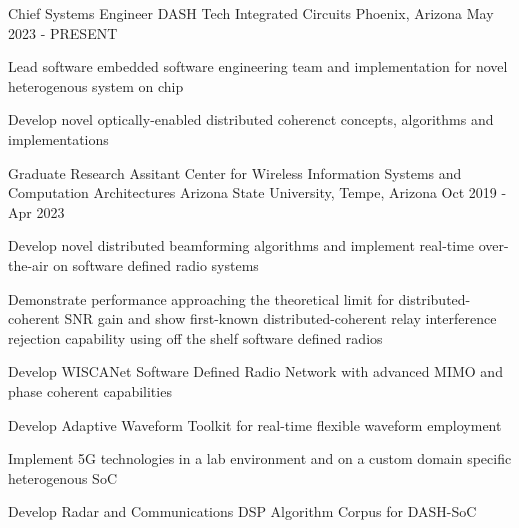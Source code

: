 

\begin{cventries}
    \cventry
    {Chief Systems Engineer} %
    {DASH Tech Integrated Circuits} %
    {Phoenix, Arizona} %
    {May 2023 - PRESENT} %
    {
        \begin{cvitems} %
            \item {Lead software embedded software engineering team and implementation for novel heterogenous system on chip}
            \item {Develop novel optically-enabled distributed coherenct concepts, algorithms and implementations}
        \end{cvitems}
    }

    \cventry
    {Graduate Research Assitant} %
    {Center for Wireless Information Systems and Computation Architectures} %
    {Arizona State University, Tempe, Arizona} %
    {Oct 2019 - Apr 2023} %
    {
        \begin{cvitems} %
        \item {Develop novel distributed beamforming algorithms and implement real-time over-the-air on software defined radio systems}
        \item {Demonstrate performance approaching the theoretical limit for distributed-coherent SNR gain and show first-known distributed-coherent relay interference rejection capability using off the shelf software defined radios}
        \item {Develop WISCANet Software Defined Radio Network with advanced MIMO and phase coherent capabilities}
        \item {Develop Adaptive Waveform Toolkit for real-time flexible waveform employment}
        \item {Implement 5G technologies in a lab environment and on a custom domain specific heterogenous SoC}
        \item {Develop Radar and Communications DSP Algorithm Corpus for DASH-SoC}
        \end{cvitems}
    }


\end{cventries}
